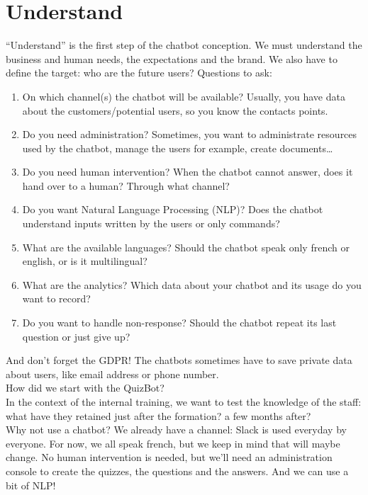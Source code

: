 \documentclass{article}
\begin{document}
\section{Understand}
“Understand” is the first step of the chatbot conception. We must understand the business and human needs, the expectations and the brand. We also have to define the target: who are the future users?
Questions to ask:
\begin{enumerate}
    \item On which channel(s) the chatbot will be available? Usually, you have data about the customers/potential users, so you know the contacts points.
    \item Do you need administration? Sometimes, you want to administrate resources used by the chatbot, manage the users for example, create documents…
    \item Do you need human intervention? When the chatbot cannot answer, does it hand over to a human? Through what channel?
    \item Do you want Natural Language Processing (NLP)? Does the chatbot understand inputs written by the users or only commands?
    \item What are the available languages? Should the chatbot speak only french or english, or is it multilingual?
    \item What are the analytics? Which data about your chatbot and its usage do you want to record?
    \item Do you want to handle non-response? Should the chatbot repeat its last question or just give up?
\end{enumerate}
And don’t forget the GDPR! The chatbots sometimes have to save private data about users, like email address or phone number.\\
\break 
How did we start with the QuizBot?\\ In the context of the internal training, we want to test the knowledge of the staff: what have they retained just after the formation? a few months after?\\
Why not use a chatbot? We already have a channel: Slack is used everyday by everyone.
For now, we all speak french, but we keep in mind that will maybe change. No human intervention is needed, but we’ll need an administration console to create the quizzes, the questions and the answers. And we can use a bit of NLP!
\end{document}
